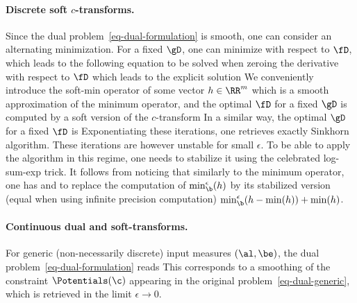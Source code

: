\paragraph{Discrete soft $c$-transforms.}

Since the dual problem~\eqref{eq-dual-formulation} is smooth, one can consider an alternating minimization. For a fixed $\gD$, one can minimize with respect to $\fD$, which leads to the following equation to be solved when zeroing the derivative with respect to $\fD$ 
which leads to the explicit solution 
We conveniently introduce the soft-min operator of some vector $h \in \RR^m$
which is a smooth approximation of the minimum operator, and the optimal $\fD$ for a fixed $\gD$ is computed by a soft version of the $c$-transform
In a similar way, the optimal $\gD$ for a fixed $\fD$ is
Exponentiating these iterations, one retrieves exactly Sinkhorn algorithm. These iterations are however unstable for small $\epsilon$. To be able to apply the algorithm in this regime, one needs to stabilize it using the celebrated log-sum-exp trick. It follows from noticing that similarly to the minimum operator, one has 
and to replace the computation of ${\min}_{\b}^\epsilon(h)$ by its stabilized version (equal when using infinite precision computation) ${\min}_{\b}^\epsilon(h-\min(h)) +  \min(h)$. 

\paragraph{Continuous dual and soft-transforms.}

For generic (non-necessarily discrete) input measures $(\al,\be)$, the dual problem~\eqref{eq-dual-formulation} reads
This corresponds to a smoothing of the constraint $\Potentials(\c)$ appearing in the original problem~\eqref{eq-dual-generic}, which is retrieved in the limit $\epsilon \rightarrow 0$.

